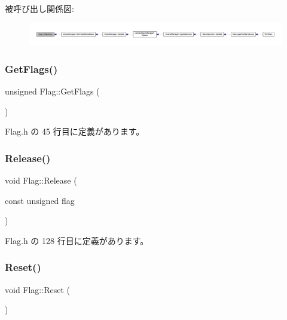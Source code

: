 被呼び出し関係図\+:
\nopagebreak
\begin{figure}[H]
\begin{center}
\leavevmode
\includegraphics[width=350pt]{class_flag_a3efc58733cf4aae0ff1ab0752aa4c702_icgraph}
\end{center}
\end{figure}
\mbox{\label{class_flag_a0a2b25c70f1a7d90cd90c595b37ffc2a}} 
\subsubsection{\texorpdfstring{Get\+Flags()}{GetFlags()}}
{\footnotesize\ttfamily unsigned Flag\+::\+Get\+Flags (\begin{DoxyParamCaption}{ }\end{DoxyParamCaption})\hspace{0.3cm}{\ttfamily [inline]}}



 Flag.\+h の 45 行目に定義があります。

\mbox{\label{class_flag_a69ac5240829e3f509c64ca28b2344b6d}} 
\subsubsection{\texorpdfstring{Release()}{Release()}}
{\footnotesize\ttfamily void Flag\+::\+Release (\begin{DoxyParamCaption}\item[{const unsigned}]{flag }\end{DoxyParamCaption})\hspace{0.3cm}{\ttfamily [inline]}}



 Flag.\+h の 128 行目に定義があります。

\mbox{\label{class_flag_aef13ac09901558208fa1d8b63549c2ae}} 
\subsubsection{\texorpdfstring{Reset()}{Reset()}}
{\footnotesize\ttfamily void Flag\+::\+Reset (\begin{DoxyParamCaption}{ }\end{DoxyParamCaption})\hspace{0.3cm}{\ttfamily [inline]}}



